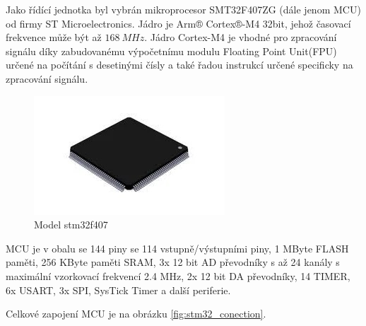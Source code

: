 Jako řídící jednotka byl vybrán mikroprocesor SMT32F407ZG (dále jenom MCU) od firmy ST Microelectronics.
Jádro je Arm® Cortex®-M4 32bit, jehož časovací frekvence může být až $168 \ MHz$. Jádro Cortex-M4 je vhodné pro zpracování signálu díky zabudovanému výpočetnímu modulu Floating Point Unit(FPU) určené na
počítání s desetinými čísly a také řadou instrukcí určené specificky na zpracování signálu.
\begin{figure}[H]
    \centering
    \includegraphics[width=0.5\linewidth]{pictures/stm32f407.jpg}
    \caption{Model stm32f407}
    \label{fig:stm32}
\end{figure}
MCU je v obalu se 144 piny se 114 vstupně/výstupními piny, 1 MByte FLASH paměti, 256 KByte paměti SRAM, 3x 12 bit AD převodníky s až 24 kanály s maximální vzorkovací frekvencí 2.4 MHz,
2x 12 bit DA převodníky, 14 TIMER, 6x USART, 3x SPI, SysTick Timer a další periferie.
\par
Celkové zapojení MCU je na obrázku \ref{fig:stm32_conection}.

